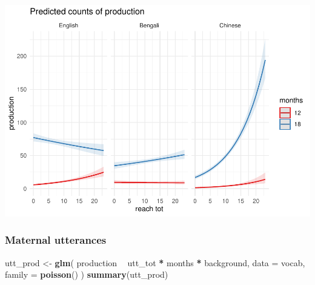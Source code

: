 \documentclass[]{article}
\newenvironment{Shaded}{\begin{snugshade}}{\end{snugshade}}
\newcommand{\DataTypeTok}[1]{\textcolor[rgb]{0.13,0.29,0.53}{#1}}
\newcommand{\KeywordTok}[1]{\textcolor[rgb]{0.13,0.29,0.53}{\textbf{#1}}}
\newcommand{\NormalTok}[1]{#1}
\newcommand{\OperatorTok}[1]{\textcolor[rgb]{0.81,0.36,0.00}{\textbf{#1}}}
\newcommand{\StringTok}[1]{\textcolor[rgb]{0.31,0.60,0.02}{#1}}
\begin{document}
\includegraphics{supplement_files/figure-latex/reach-lm-2-undsay-plot-1.pdf}

\hypertarget{maternal-utterances-1}{%
\subsubsection{Maternal utterances}\label{maternal-utterances-1}}

\begin{Shaded}
\begin{Highlighting}[]
\NormalTok{utt_prod <-}\StringTok{ }\KeywordTok{glm}\NormalTok{(}
\NormalTok{  production }\OperatorTok{~}
\StringTok{    }\NormalTok{utt_tot }\OperatorTok{*}
\StringTok{    }\NormalTok{months }\OperatorTok{*}
\StringTok{    }\NormalTok{background,}
  \DataTypeTok{data =}\NormalTok{ vocab,}
  \DataTypeTok{family =} \KeywordTok{poisson}\NormalTok{()}
\NormalTok{)}
\KeywordTok{summary}\NormalTok{(utt_prod)}
\end{Highlighting}
\end{Shaded}
\end{document}
